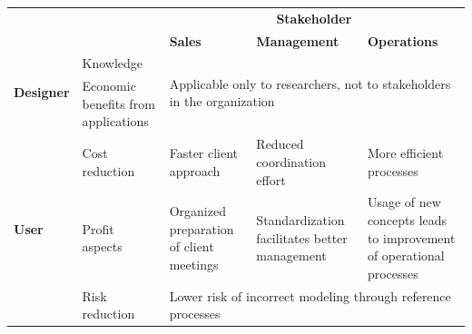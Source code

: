 \begin{table}[caption={Benefits of Reference Modelling for BPO-providers in CRM }, label=tab:refmodbpobenefits]
	\centering
	\begin{tabular}{p{1cm} p{2cm} |p{3cm} | p{3cm} | p{3cm} |} 
		\cline{3-5}
		&                                     & \multicolumn{3}{c|}{\textbf{Stakeholder}}                                                                                                                                           \\ \cline{3-5} 
		&                                     & \textbf{Sales}                                          & \textbf{Management}                                 & \textbf{Operations}                                                 \\ \hline
		\multicolumn{1}{|l|}{\multirow{2}{*}{\textbf{Designer}}} & Knowledge                           & \multicolumn{3}{p{3cm}|}{\multirow{2}{*}{\parbox[c]{9cm}{Applicable only to researchers, not to stakeholders in the organization}}}                                                                       \\ \cline{2-2}
		\multicolumn{1}{|l|}{}                                   & Economic benefits from applications & \multicolumn{3}{l|}{}                                                                                                                                                               \\ \hline
		\multicolumn{1}{|l|}{\multirow{5}{*}{\textbf{User}}}     & Cost reduction                      & Faster client approach                                  & Reduced coordination effort                         & More efficient processes                                            \\ \cline{2-5} 
		\multicolumn{1}{|l|}{}                                   & Profit aspects                      & Organized preparation of client meetings                & Standardization facilitates better management       & Usage of new concepts leads to improvement of operational processes \\ \cline{2-5} 
		\multicolumn{1}{|l|}{}                                   & Risk reduction                      & \multicolumn{3}{l|}{\parbox[t]{9cm}{Lower risk of incorrect modeling through reference processes}}                                                                                                  \\ \cline{2-5} 

\end{tabular}
\end{table}
